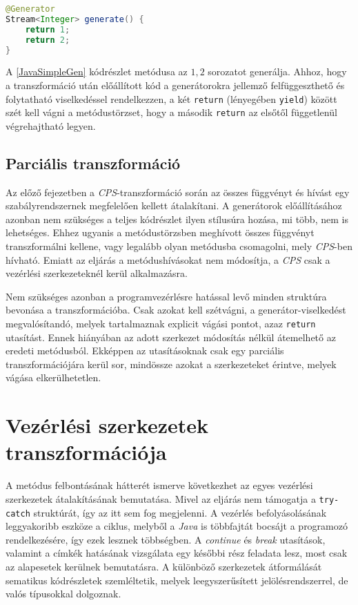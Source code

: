 \begin{lstlisting}[language=Java, caption={Az $1, 2$ sorozatot előállító generátor}, captionpos=b, label=JavaSimpleGen, escapechar=$]
@Generator
Stream<Integer> generate() {
    return 1;
    return 2;
}
\end{lstlisting}

A \ref{JavaSimpleGen} kódrészlet metódusa az $1,2$ sorozatot generálja. Ahhoz, hogy a transzformáció után előállított kód a generátorokra jellemző felfüggeszthető és folytatható viselkedéssel rendelkezzen, a két \texttt{return} (lényegében \texttt{yield}) között szét kell vágni a metódustörzset, hogy a második \texttt{return} az elsőtől függetlenül végrehajtható legyen.

\subsection{Parciális transzformáció}

Az előző fejezetben a \textit{CPS}-transzformáció során az összes függvényt és hívást egy szabályrendszernek megfelelően kellett átalakítani. A generátorok előállításához azonban nem szükséges a teljes kódrészlet ilyen stílusúra hozása, mi több, nem is lehetséges. Ehhez ugyanis a metódustörzsben meghívott összes függvényt transzformálni kellene, vagy legalább olyan metódusba csomagolni, mely \textit{CPS}-ben hívható. Emiatt az eljárás a metódushívásokat nem módosítja, a \textit{CPS} csak a vezérlési szerkezeteknél kerül alkalmazásra.

Nem szükséges azonban a programvezérlésre hatással levő minden struktúra bevonása a transzformációba. Csak azokat kell szétvágni, a generátor-viselkedést megvalósítandó, melyek tartalmaznak explicit vágási pontot, azaz \texttt{return} utasítást. Ennek hiányában az adott szerkezet módosítás nélkül átemelhető az eredeti metódusból. Ekképpen az utasításoknak csak egy parciális transzformációjára kerül sor, mindössze azokat a szerkezeteket érintve, melyek vágása elkerülhetetlen.

\section{Vezérlési szerkezetek transzformációja}

A metódus felbontásának hátterét ismerve következhet az egyes vezérlési szerkezetek átalakításának bemutatása. Mivel az eljárás nem támogatja a \texttt{try-catch} struktúrát, így az itt sem fog megjelenni. A vezérlés befolyásolásának leggyakoribb eszköze a ciklus, melyből a \textit{Java} is többfajtát bocsájt a programozó rendelkezésére, így ezek lesznek többségben. A \textit{continue} és \textit{break} utasítások, valamint a címkék hatásának vizsgálata egy későbbi rész feladata lesz, most csak az alapesetek kerülnek bemutatásra. A különböző szerkezetek átformálását sematikus kódrészletek szemléltetik, melyek leegyszerűsített jelölésrendszerrel, de valós típusokkal dolgoznak. 


